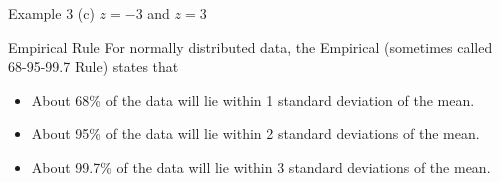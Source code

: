 \documentclass[t]{beamer}
\begin{document}
\begin{frame}{Example 3}
(c)	\quad $z = -3$ and $z = 3$	\newline\\
\begin{minipage}{0.5\textwidth}
\end{minipage}
\hspace{0.25cm}
\begin{minipage}{0.4\textwidth}
\end{minipage}
\end{frame}

\begin{frame}{Empirical Rule}
For normally distributed data, the Empirical (sometimes called 68-95-99.7 Rule) states that
\begin{itemize}
	\item<2-> About 68\% of the data will lie within 1 standard deviation of the mean.
	\item<3-> About 95\% of the data will lie within 2 standard deviations of the mean.
	\item<4-> About 99.7\% of the data will lie within 3 standard deviations of the mean.
\end{itemize}
\end{frame}
\end{document}
